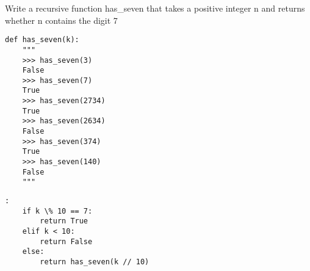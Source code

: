 \begin{blocksection}
\question Write a recursive function has_seven that takes a positive integer n and returns whether n contains the digit 7

\begin{lstlisting}
def has_seven(k):
    """
    >>> has_seven(3)
    False
    >>> has_seven(7)
    True
    >>> has_seven(2734)
    True
    >>> has_seven(2634)
    False
    >>> has_seven(374)
    True
    >>> has_seven(140)
    False
    """
\end{lstlisting}

\begin{solution}[1in]
\begin{lstlisting}:
    if k \% 10 == 7:
        return True
    elif k < 10:
        return False
    else:
        return has_seven(k // 10)
\end{lstlisting}
\end{solution}
\end{blocksection}